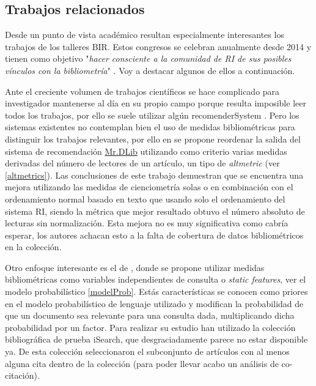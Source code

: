 \subsection{Trabajos relacionados}
\label{subsc:trabajosRelacionados}
Desde un punto de vista académico resultan especialmente interesantes los trabajos de los talleres \acrfull{BIR}. Estos congresos se celebran anualmente desde 2014 y tienen como objetivo "\textit{hacer consciente a la comunidad de \acrshort{RI} de sus posibles vínculos con la bibliometría}" \cite{DBLP:conf/ecir/X14}. Voy a destacar algunos de ellos a continuación.

Ante el creciente volumen de trabajos científicos se hace complicado para investigador mantenerse al día en su propio campo porque resulta imposible leer todos los trabajos, por ello se suele utilizar algún \gls{recomenderSystem} . Pero los sistemas existentes no contemplan bien el uso de medidas bibliométricas para distinguir los trabajos relevantes, por ello en \cite{DBLP:conf/ecir/SiebertDF17} se propone reordenar la salida del sistema de recomendación \href{mr-dlib.org}{\acrshort{Mr.DLib}} utilizando como criterio varias medidas derivadas del número de lectores de un artículo, un tipo de \textit{altmetric} (ver \ref{altmetrics}). Las conclusiones de este trabajo demuestran que se encuentra una mejora utilizando las medidas de cienciometría solas o en combinación con el ordenamiento normal basado en texto que usando solo el ordenamiento del sistema \acrshort{RI}, siendo la métrica que mejor resultado obtuvo el número absoluto de lecturas sin normalización. Esta mejora no es muy significativa como cabría esperar, los autores achacan esto a la falta de cobertura de datos bibliométricos en la colección.

Otro enfoque interesante es el de \cite{DBLP:conf/ecir/ZhaoH14}, donde se propone utilizar medidas bibliométricas como variables independientes de consulta o \textit{static features}, ver el modelo probabilístico \ref{modelProb}. Estás características se conocen como priores en el modelo probabilístico de lenguaje utilizado y modifican la probabilidad de que un documento sea relevante para una consulta dada, multiplicando dicha probabilidad por un factor. Para realizar su estudio han utilizado la colección bibliográfica de prueba iSearch, que desgraciadamente parece no estar disponible ya. De esta colección seleccionaron el subconjunto de artículos con al menos alguna cita dentro de la colección (para poder llevar acabo un análisis de co-citación). 

